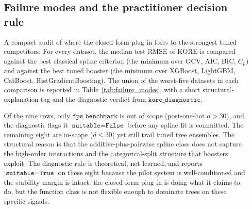 \documentclass{article}
\newcommand{\KORE}{\textsc{KORE}}
\begin{document}
\subsection{Failure modes and the practitioner decision rule}
\label{sec:app_failure_modes}

A compact audit of where the closed-form plug-in loses to the strongest tuned competitors. For every dataset, the median test RMSE of \KORE{} is compared against the best classical spline criterion (the minimum over GCV, AIC, BIC, $C_p$) and against the best tuned booster (the minimum over XGBoost, LightGBM, CatBoost, HistGradientBoosting). The union of the worst-five datasets in each comparison is reported in Table~\ref{tab:failure_modes}, with a short structural-explanation tag and the diagnostic verdict from $\texttt{kore\_diagnostic}$.

Of the nine rows, only $\texttt{fps\_benchmark}$ is out of scope (post-one-hot $d > 30$), and the diagnostic flags it $\texttt{suitable} = \texttt{False}$ before any spline fit is committed. The remaining eight are in-scope ($d \le 30$) yet still trail tuned tree ensembles. The structural reason is that the additive-plus-pairwise spline class does not capture the high-order interactions and the categorical-split structure that boosters exploit. The diagnostic rule is theoretical, not learned, and reports $\texttt{suitable} = \texttt{True}$ on these eight because the pilot system is well-conditioned and the stability margin is intact; the closed-form plug-in is doing what it claims to do, but the function class is not flexible enough to dominate trees on these specific signals.
\end{document}
